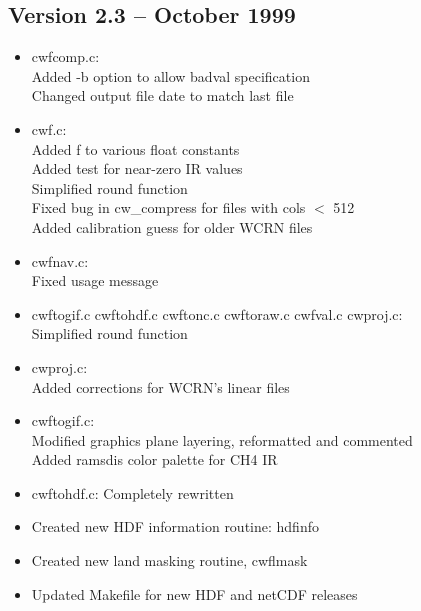 
\subsection*{Version 2.3 -- October 1999}

\begin{itemize}

  \item cwfcomp.c:\\
   Added -b option to allow badval specification\\
   Changed output file date to match last file

  \item cwf.c:\\
   Added f to various float constants\\
   Added test for near-zero IR values\\
   Simplified round function\\
   Fixed bug in cw\_compress for files with cols $<$ 512\\
   Added calibration guess for older WCRN files

  \item cwfnav.c:\\
   Fixed usage message

  \item cwftogif.c cwftohdf.c cwftonc.c cwftoraw.c cwfval.c cwproj.c:\\
   Simplified round function

  \item cwproj.c:\\
   Added corrections for WCRN's linear files

  \item cwftogif.c: \\
  Modified graphics plane layering, reformatted and commented\\
  Added ramsdis color palette for CH4 IR

  \item cwftohdf.c: Completely rewritten

  \item Created new HDF information routine: hdfinfo

  \item Created new land masking routine, cwflmask

  \item Updated Makefile for new HDF and netCDF releases

\end{itemize}

